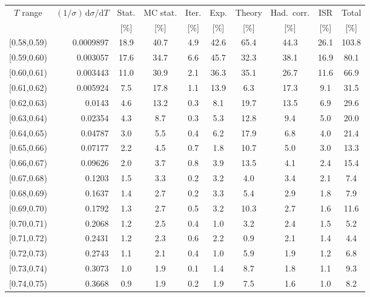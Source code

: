 \begin{table}[t!]
\centering
\scriptsize
\begin{tabular}{c r c c c c c c c c}
\hline
$T$ range & $(1/\sigma)\,\mathrm{d}\sigma/\mathrm{d}T$ & Stat. & MC stat. & Iter. & Exp. & Theory & Had.\ corr. & ISR & Total \\
 & & [\%] & [\%] & [\%] & [\%] & [\%] & [\%] & [\%] & [\%] \\
\hline
{[0.58,0.59)} & 0.0009897 & 18.9 & 40.7 & 4.9 & 42.6 & 65.4 & 44.3 & 26.1 & 103.8 \\
{[0.59,0.60)} & 0.003057 & 17.6 & 34.7 & 6.6 & 45.7 & 32.3 & 38.1 & 16.9 & 80.1 \\
{[0.60,0.61)} & 0.003443 & 11.0 & 30.9 & 2.1 & 36.3 & 35.1 & 26.7 & 11.6 & 66.9 \\
{[0.61,0.62)} & 0.005924 & 7.5 & 17.8 & 1.1 & 13.9 & 6.3 & 17.3 & 9.1 & 31.5 \\
{[0.62,0.63)} & 0.0143 & 4.6 & 13.2 & 0.3 & 8.1 & 19.7 & 13.5 & 6.9 & 29.6 \\
{[0.63,0.64)} & 0.02354 & 4.3 & 8.7 & 0.3 & 5.3 & 12.8 & 9.4 & 5.0 & 20.0 \\
{[0.64,0.65)} & 0.04787 & 3.0 & 5.5 & 0.4 & 6.2 & 17.9 & 6.8 & 4.0 & 21.4 \\
{[0.65,0.66)} & 0.07177 & 2.2 & 4.5 & 0.7 & 1.8 & 10.7 & 5.0 & 3.0 & 13.3 \\
{[0.66,0.67)} & 0.09626 & 2.0 & 3.7 & 0.8 & 3.9 & 13.5 & 4.1 & 2.4 & 15.4 \\
{[0.67,0.68)} & 0.1203 & 1.5 & 3.3 & 0.2 & 3.2 & 4.0 & 3.4 & 2.1 & 7.4 \\
{[0.68,0.69)} & 0.1637 & 1.4 & 2.7 & 0.2 & 3.3 & 5.4 & 2.9 & 1.8 & 7.9 \\
{[0.69,0.70)} & 0.1792 & 1.3 & 2.7 & 0.5 & 3.2 & 10.3 & 2.7 & 1.6 & 11.6 \\
{[0.70,0.71)} & 0.2068 & 1.2 & 2.5 & 0.4 & 1.0 & 3.2 & 2.4 & 1.5 & 5.2 \\
{[0.71,0.72)} & 0.2431 & 1.2 & 2.3 & 0.6 & 2.2 & 0.9 & 2.1 & 1.4 & 4.4 \\
{[0.72,0.73)} & 0.2743 & 1.1 & 2.1 & 0.4 & 1.0 & 5.9 & 1.9 & 1.2 & 6.8 \\
{[0.73,0.74)} & 0.3073 & 1.0 & 1.9 & 0.1 & 1.4 & 8.7 & 1.8 & 1.1 & 9.3 \\
{[0.74,0.75)} & 0.3668 & 0.9 & 1.9 & 0.2 & 1.9 & 7.5 & 1.6 & 1.0 & 8.2 \\

\end{tabular}
\end{table}
